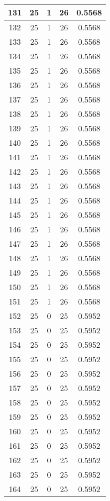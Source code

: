 \documentclass[letterpaper, 12pt]{article}
\begin{document}
\begin{longtable}{|c|c|c|c|c|}
\hline
131 & 25 & 1 & 26 & 0.5568 \\
\hline
132 & 25 & 1 & 26 & 0.5568 \\
\hline
133 & 25 & 1 & 26 & 0.5568 \\
\hline
134 & 25 & 1 & 26 & 0.5568 \\
\hline
135 & 25 & 1 & 26 & 0.5568 \\
\hline
136 & 25 & 1 & 26 & 0.5568 \\
\hline
137 & 25 & 1 & 26 & 0.5568 \\
\hline
138 & 25 & 1 & 26 & 0.5568 \\
\hline
139 & 25 & 1 & 26 & 0.5568 \\
\hline
140 & 25 & 1 & 26 & 0.5568 \\
\hline
141 & 25 & 1 & 26 & 0.5568 \\
\hline
142 & 25 & 1 & 26 & 0.5568 \\
\hline
143 & 25 & 1 & 26 & 0.5568 \\
\hline
144 & 25 & 1 & 26 & 0.5568 \\
\hline
145 & 25 & 1 & 26 & 0.5568 \\
\hline
146 & 25 & 1 & 26 & 0.5568 \\
\hline
147 & 25 & 1 & 26 & 0.5568 \\
\hline
148 & 25 & 1 & 26 & 0.5568 \\
\hline
149 & 25 & 1 & 26 & 0.5568 \\
\hline
150 & 25 & 1 & 26 & 0.5568 \\
\hline
151 & 25 & 1 & 26 & 0.5568 \\
\hline
152 & 25 & 0 & 25 & 0.5952 \\
\hline
153 & 25 & 0 & 25 & 0.5952 \\
\hline
154 & 25 & 0 & 25 & 0.5952 \\
\hline
155 & 25 & 0 & 25 & 0.5952 \\
\hline
156 & 25 & 0 & 25 & 0.5952 \\
\hline
157 & 25 & 0 & 25 & 0.5952 \\
\hline
158 & 25 & 0 & 25 & 0.5952 \\
\hline
159 & 25 & 0 & 25 & 0.5952 \\
\hline
160 & 25 & 0 & 25 & 0.5952 \\
\hline
161 & 25 & 0 & 25 & 0.5952 \\
\hline
162 & 25 & 0 & 25 & 0.5952 \\
\hline
163 & 25 & 0 & 25 & 0.5952 \\
\hline
164 & 25 & 0 & 25 & 0.5952 \\

\end{longtable}
\end{document}
